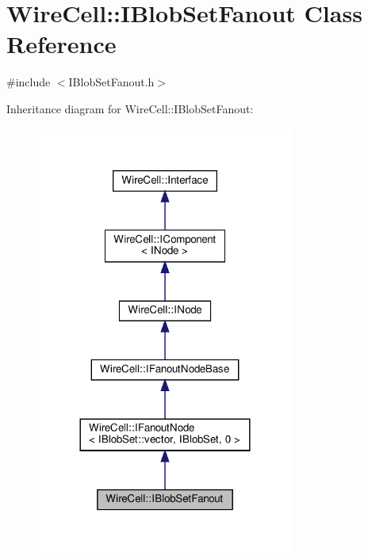 \hypertarget{class_wire_cell_1_1_i_blob_set_fanout}{}\section{Wire\+Cell\+:\+:I\+Blob\+Set\+Fanout Class Reference}
\label{class_wire_cell_1_1_i_blob_set_fanout}


{\ttfamily \#include $<$I\+Blob\+Set\+Fanout.\+h$>$}



Inheritance diagram for Wire\+Cell\+:\+:I\+Blob\+Set\+Fanout\+:
\nopagebreak
\begin{figure}[H]
\begin{center}
\leavevmode
\includegraphics[width=240pt]{class_wire_cell_1_1_i_blob_set_fanout__inherit__graph}
\end{center}
\end{figure}


